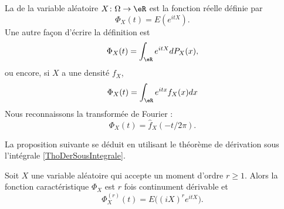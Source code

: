 La  de la variable aléatoire \( X\colon \Omega\to \eR\) est la fonction réelle définie par
\begin{equation}
    \Phi_X(t)=E( e^{itX}).
\end{equation}
Une autre façon d'écrire la définition est
\begin{equation}
    \Phi_X(t)=\int_{\eR} e^{itX}dP_X(x),
\end{equation}
ou encore, si \( X\) a une densité \( f_X\),
\begin{equation}        \label{EqFnCaractfncadens}
    \Phi_X(t)=\int_{\eR} e^{itx}f_X(x)dx
\end{equation}
Nous reconnaissons la transformée de Fourier :
\begin{equation}
    \Phi_X(t)=\hat f_X(-t/2\pi).
\end{equation}

La proposition suivante se déduit en utilisant le théorème de dérivation sous l'intégrale \ref{ThoDerSousIntegrale}.
\begin{proposition}     \label{PropDerFnCaract}
    Soit $X$ une variable aléatoire qui accepte un moment d'ordre \( r\geq 1\). Alors la fonction caractéristique \( \Phi_X\) est \( r\) fois continument dérivable et
    \begin{equation}
        \Phi_X^{(r)}(t)=E\big( (iX)^r e^{itX} \big).
    \end{equation}
\end{proposition}


